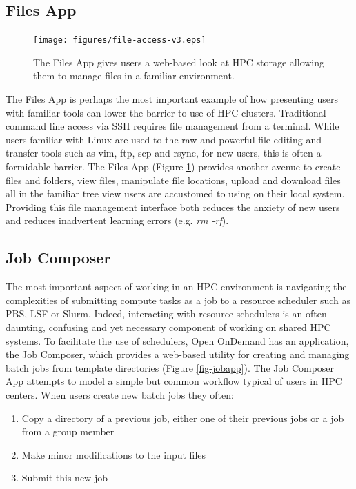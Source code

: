 \documentclass[runningheads]{llncs}
\begin{document}
\newpage

\subsection{Files App}

\begin{figure}
    \texttt{[image: figures/file-access-v3.eps]}
    \caption{The Files App gives users a web-based look at HPC storage allowing them to manage files in a familiar environment.} \label{fig-filesapp}
\end{figure}

The Files App is perhaps the most important example of how presenting users with familiar tools can lower the barrier to use of HPC clusters.  Traditional command line access via SSH requires file management from a terminal.  While users familiar with Linux are used to the raw and powerful file editing and transfer tools such as vim, ftp, scp and rsync, for new users, this is often a formidable barrier.  The Files App (Figure \ref{fig-filesapp}) provides another avenue to create files and folders, view files, manipulate file locations, upload and download files all in the familiar tree view users are accustomed to using on their local system.  Providing this file management interface both reduces the anxiety of new users and reduces inadvertent learning errors (e.g. \textit{rm -rf}).

\subsection{Job Composer}

The most important aspect of working in an HPC environment is navigating the complexities of submitting compute tasks as a job to a resource scheduler such as PBS, LSF or Slurm. Indeed, interacting with resource schedulers is an often daunting, confusing and yet necessary component of working on shared HPC systems.  To facilitate the use of schedulers, Open OnDemand has an application, the Job Composer, which provides a web-based utility for creating and managing batch jobs from template directories (Figure \ref{fig-jobapp}). The Job Composer App attempts to model a simple but common workflow typical of users in HPC centers. When users create new batch jobs they often:

\begin{enumerate}
    \item Copy a directory of a previous job, either one of their previous jobs or a job from a group member
    \item Make minor modifications to the input files
    \item Submit this new job
\end{enumerate}
\end{document}
